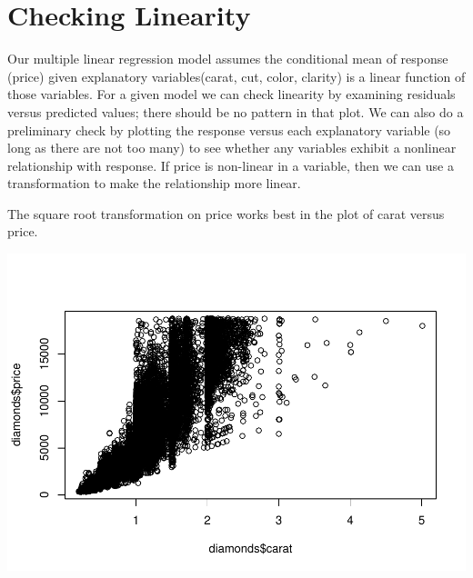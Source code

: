 \documentclass[
]{book}
\newenvironment{Shaded}{\begin{snugshade}}{\end{snugshade}}
\newcommand{\FunctionTok}[1]{\textcolor[rgb]{0.00,0.00,0.00}{#1}}
\newcommand{\NormalTok}[1]{#1}
\newcommand{\SpecialCharTok}[1]{\textcolor[rgb]{0.00,0.00,0.00}{#1}}
\begin{document}
\hypertarget{checking-linearity}{%
\section{Checking Linearity}\label{checking-linearity}}

Our multiple linear regression model assumes the conditional mean of response (price) given explanatory variables(carat, cut, color, clarity) is a linear function of those variables. For a given model we can check linearity by examining residuals versus predicted values; there should be no pattern in that plot. We can also do a preliminary check by plotting the response versus each explanatory variable (so long as there are not too many) to see whether any variables exhibit a nonlinear relationship with response. If price is non-linear in a variable, then we can use a transformation to make the relationship more linear.

The square root transformation on price works best in the plot of carat versus price.

\begin{Shaded}
\end{Shaded}

\includegraphics{13-MultipleLinearRegression_files/figure-latex/unnamed-chunk-3-1.pdf}

\begin{Shaded}
\end{Shaded}
\end{document}
